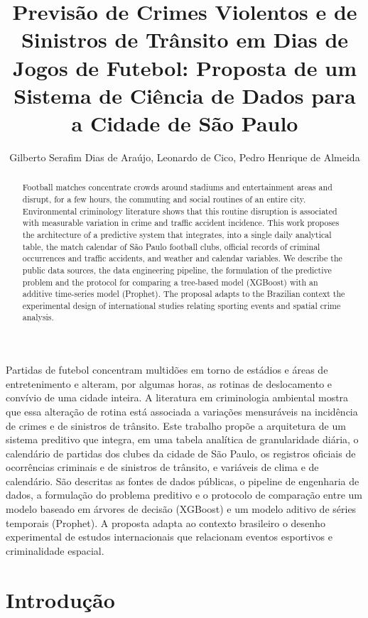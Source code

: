 \documentclass[12pt]{article}
\title{Previsão de Crimes Violentos e de Sinistros de Trânsito em Dias
de Jogos de Futebol: Proposta de um Sistema de Ciência de Dados para a
Cidade de São Paulo}
\author{Gilberto Serafim Dias de Araújo\inst{1}, Leonardo de Cico\inst{1},
Pedro Henrique de Almeida\inst{1}}
\begin{document}
\maketitle

\begin{resumo}
Partidas de futebol concentram multidões em torno de estádios e áreas de
entretenimento e alteram, por algumas horas, as rotinas de deslocamento e
convívio de uma cidade inteira. A literatura em criminologia ambiental mostra
que essa alteração de rotina está associada a variações mensuráveis na
incidência de crimes e de sinistros de trânsito. Este trabalho propõe a
arquitetura de um sistema preditivo que integra, em uma tabela analítica de
granularidade diária, o calendário de partidas dos clubes da cidade de São
Paulo, os registros oficiais de ocorrências criminais e de sinistros de
trânsito, e variáveis de clima e de calendário. São descritas as fontes de
dados públicas, o pipeline de engenharia de dados, a formulação do problema
preditivo e o protocolo de comparação entre um modelo baseado em árvores de
decisão (XGBoost) e um modelo aditivo de séries temporais (Prophet). A
proposta adapta ao contexto brasileiro o desenho experimental de estudos
internacionais que relacionam eventos esportivos e criminalidade espacial.
\end{resumo}

\begin{abstract}
Football matches concentrate crowds around stadiums and entertainment areas
and disrupt, for a few hours, the commuting and social routines of an entire
city. Environmental criminology literature shows that this routine disruption
is associated with measurable variation in crime and traffic accident
incidence. This work proposes the architecture of a predictive system that
integrates, into a single daily analytical table, the match calendar of São
Paulo football clubs, official records of criminal occurrences and traffic
accidents, and weather and calendar variables. We describe the public data
sources, the data engineering pipeline, the formulation of the predictive
problem and the protocol for comparing a tree-based model (XGBoost) with an
additive time-series model (Prophet). The proposal adapts to the Brazilian
context the experimental design of international studies relating sporting
events and spatial crime analysis.
\end{abstract}

\section{Introdução}
\end{document}
